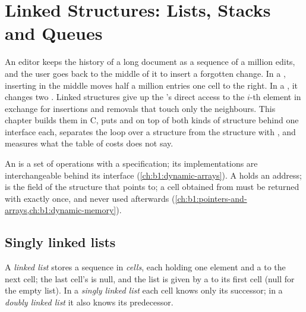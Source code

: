 \chapter{Linked Structures: Lists, Stacks and Queues}\label{ch:b1:linked-structures}

An editor keeps the history of a long document as a sequence of a million edits, and the user goes back to the middle
of it to insert a forgotten change. In a , inserting in the middle moves half a million entries one cell
to the right. In a , it changes two . Linked structures give up the 's direct access to the
$i$-th element in exchange for insertions and removals that touch only the neighbours. This chapter builds them in C,
puts  and  on top of both kinds of structure behind one interface each, separates the loop over a
structure from the structure with , and measures what the table of costs does not say.

\begin{recall}
An  is a set of operations with a specification; its implementations are interchangeable behind its
interface (\cref{ch:b1:dynamic-arrays}). A  holds an address;  is the field  of the
structure that  points to; a cell obtained from  must be returned with  exactly once, and
never used afterwards (\cref{ch:b1:pointers-and-arrays,ch:b1:dynamic-memory}).
\end{recall}

\section{Singly linked lists}\label{sec:b1:linked-structures:singly}

\begin{definition}\label{def:b1:linked-structures:list}
A \emph{linked list} stores a sequence in \emph{cells}, each holding
one element and a  to the next cell; the last cell's  is null, and the list is given by a  to its
first cell (null for the empty list). In a \emph{singly linked list} each cell knows only its
successor; in a \emph{doubly linked list} it also knows its predecessor.
\end{definition}

